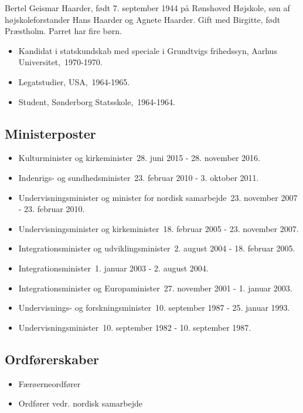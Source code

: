 \documentclass[11pt, a4paper]{awesome-cv}
\begin{document}
\makecvheader[R]
\makelettertitle
\begin{cvletter}
Bertel Geismar Haarder, født 7. september 1944 på Rønshoved Højskole, søn af højskoleforstander Hans Haarder og Agnete Haarder. Gift med Birgitte, født Præstholm. Parret har fire børn.

\begin{itemize}
\item Kandidat i statskundskab med speciale i Grundtvigs frihedssyn, Aarhus Universitet, 1970-1970.
\item Legatstudier, USA, 1964-1965.
\item Student, Sønderborg Statsskole, 1964-1964.
\end{itemize}
\subsection*{Ministerposter}
\begin{itemize}
\item Kulturminister og kirkeminister 28. juni 2015 - 28. november 2016.
\item Indenrigs- og sundhedsminister 23. februar 2010 - 3. oktober 2011.
\item Undervisningsminister og minister for nordisk samarbejde 23. november 2007 - 23. februar 2010.
\item Undervisningsminister og kirkeminister 18. februar 2005 - 23. november 2007.
\item Integrationsminister og udviklingsminister 2. august 2004 - 18. februar 2005.
\item Integrationsminister 1. januar 2003 - 2. august 2004.
\item Integrationsminister og Europaminister 27. november 2001 - 1. januar 2003.
\item Undervisnings- og forskningsminister 10. september 1987 - 25. januar 1993.
\item Undervisningsminister 10. september 1982 - 10. september 1987.
\end{itemize}
\subsection*{Ordførerskaber}
\begin{itemize}
\item Færøerneordfører
\item Ordfører vedr. nordisk samarbejde
\end{itemize}

\end{cvletter}
\end{document}
